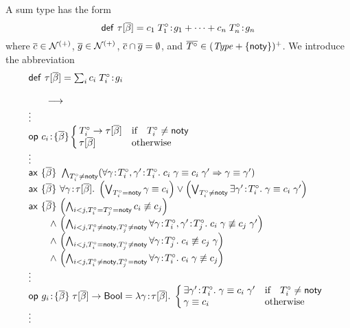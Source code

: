 A sum type has the form
\[
\mathsf{def}\ \tau[\overline{\beta}]=c_1\;T^\circ_1\!:\!g_1+\cdots+c_n\;T^\circ_n\!:\!g_n
\]
where $\overline{c}\in\mathcal{N}^{(+)}$, $\overline{g}\in\mathcal{N}^{(+)}$,
$\overline{c}\cap\overline{g}=\emptyset$, and $\overline{T^\circ}\in(\mathit{Type}+\{\mathsf{noty}\})^+$.
We introduce the abbreviation
\[
\abbvert
 {\tdefsum{\tnam}{\tvarS}{\tsumO}}
 {\vdots\\
  \odec{\cnam_i}{\tvarS}
       {\!\!\cond{\optyp_i\neq\notyp}
               {\tarr{\optyp_i}{\tinst{\tnam}{\tvarS}}}
               {\tinst{\tnam}{\tvarS}}}
  \\\vdots\\
  \ax{\tvarS}{\conjI{\optyp_i\neq\notyp}
                    {(\faS{\seqII{\bnd{\varfx}{\optyp_i}}
                                 {\bnd{\varfx'}{\optyp_i}}}
                          {\impl{\eq{\app{\cnam_i}{\varfx}}
                                    {\app{\cnam_i}{\varfx'}}}
                                {\eq{\varfx}{\varfx'}}})}}
  \\
  \ax{\tvarS}{\fa{\varfx}{\tinst{\tnam}{\tvarS}}
                 {\disj{\left(
                        \disjI{\optyp_i=\notyp}{\eq{\varfx}{\cnam_i}}
                        \right)}
                       {\left(
                        \disjI{\optyp_i\neq\notyp}
                              {\ex{\varfx'}{\optyp_i}
                                  {\eq{\varfx}{\app{\cnam_i}{\varfx'}}}}
                        \right)}}}
  \\
  \axLconjIV{\tvarS}
            {\left(
             \conjI{i<j,\optyp_i=\optyp_j=\notyp}
                   {\neeq{\cnam_i}{\cnam_j}}
             \right)}
            {\left(
             \conjI{i<j,\optyp_i\neq\notyp,\optyp_j\neq\notyp}
                   {\faS{\seqII{\bnd{\varfx}{\optyp_i}}
                               {\bnd{\varfx'}{\optyp_j}}}
                        {\neeq{\app{\cnam_i}{\varfx}}
                              {\app{\cnam_j}{\varfx'}}}}
             \right)}
            {\left(
             \conjI{i<j,\optyp_i=\notyp,\optyp_j\neq\notyp}
                   {\fa{\varfx}{\optyp_j}
                       {\neeq{\cnam_i}{\app{\cnam_j}{\varfx}}}}
             \right)}
            {\left(
             \conjI{i<j,\optyp_i\neq\notyp,\optyp_j=\notyp}
                   {\fa{\varfx}{\optyp_i}
                       {\neeq{\app{\cnam_i}{\varfx}}{\cnam_j}}}
             \right)}
  \\\vdots\\
  \odefI{\recog_i}{\tvarS}{\tarr{\tinst{\tnam}{\tvarS}}{\bool}}
        {\abs{\varfx}{\tinst{\tnam}{\tvarS}}
             {\cond{\optyp_i\neq\notyp}
                   {\ex{\varfx'}{\optyp_i}
                       {\eq{\varfx}{\app{\cnam_i}{\varfx'}}}}
                   {\eq{\varfx}{\cnam_i}}}}
  \\\vdots}
\]

